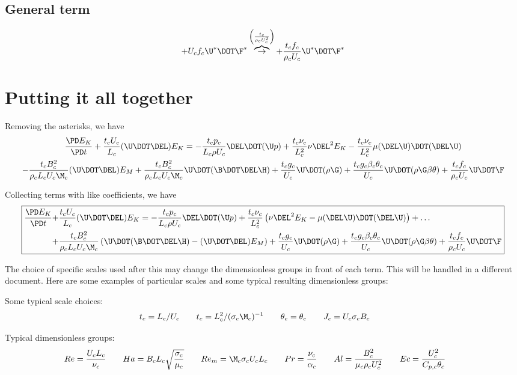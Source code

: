\documentclass[11pt]{article}
\newcommand{\OB}{\overbrace{\rightarrow}^{\left(\frac{t_c}{\rho_c U_c^2}\right)}}
\begin{document}
\subsection{General term}
\begin{equation}
	+ U_c f_c \U^* \DOT \F^*
	\OB
	+ \frac{t_c f_c}{\rho_c U_c} \U^* \DOT \F^*
\end{equation}

\section{Putting it all together}
Removing the asterisks, we have
\begin{multline}
	\frac{\PD E_K}{\PD t}
	+ \frac{t_c U_c}{L_c} (\U \DOT \DEL) E_K
	=
	- \frac{t_c p_c}{L_c \rho U_c} \DEL \DOT (\U p)
	+ \frac{t_c \nu_c}{L_c^2} \nu \DEL^2 E_K
	- \frac{t_c \nu_c}{L_c^2} \mu (\DEL \U) \DOT (\DEL \U)
	\\
	- \frac{t_c B_c^2}{\rho_c L_c U_c \M_c} (\U \DOT \DEL) E_M
	+ \frac{t_c B_c^2}{\rho_c L_c U_c \M_c} \U \DOT (\B \DOT \DEL \H)
	+ \frac{t_c g_c}{U_c} \U \DOT (\rho \G)
	+ \frac{t_c g_c \beta_c \theta_c}{U_c} \U \DOT (\rho \G \beta \theta)
	+ \frac{t_c f_c}{\rho_c U_c} \U \DOT \F
\end{multline}

Collecting terms with like coefficients, we have
\begin{equation}\boxed{\begin{aligned}
	\frac{\PD E_K}{\PD t}
	+ & \frac{t_c U_c}{L_c} (\U \DOT \DEL) E_K
	=
	- \frac{t_c p_c}{L_c \rho U_c} \DEL \DOT (\U p)
	+ \frac{t_c \nu_c}{L_c^2}
	\left( \nu \DEL^2 E_K -  \mu (\DEL \U) \DOT (\DEL \U) \right) + \hdots
	\\
	+ & \frac{t_c B_c^2}{\rho_c L_c U_c \M_c}
	\left( \U \DOT (\B \DOT \DEL \H) - (\U \DOT \DEL) E_M \right)
	+ \frac{t_c g_c}{U_c} \U \DOT (\rho \G)
	+ \frac{t_c g_c \beta_c \theta_c}{U_c} \U \DOT (\rho \G \beta \theta)
	+ \frac{t_c f_c}{\rho_c U_c} \U \DOT \F
\end{aligned}}\end{equation}

The choice of specific scales used after this may change the dimensionless groups in front of each term. This will be handled in a different document. Here are some examples of particular scales and some typical resulting dimensionless groups:

Some typical scale choices:
\begin{equation}\begin{aligned}
	t_c = L_c/ U_c \qquad
	t_c = L_c^2/ (\sigma_c \M_c)^{-1} \qquad
	\theta_c = \theta_c \qquad
	J_c = U_c \sigma_c B_c \qquad
\end{aligned}\end{equation}

Typical dimensionless groups:
\begin{equation}
	Re = \frac{U_c L_c}{\nu_c} \qquad
	Ha = B_c L_c \sqrt{\frac{\sigma_c}{\mu_c}} \qquad
	Re_m = \M_c \sigma_c U_c L_c \qquad
	Pr = \frac{\nu_c}{\alpha_c} \qquad
	Al = \frac{B_c^2}{\mu_c \rho_c U_c^2} \qquad
	Ec = \frac{U_c^2}{C_{p,c} \theta_c} \qquad
\end{equation}
\end{document}
